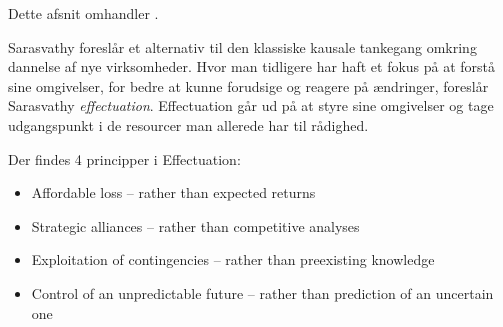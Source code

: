 
Dette afsnit omhandler \citet{sarasvathy2001effectuation}.

Sarasvathy foreslår et alternativ til den klassiske kausale tankegang omkring dannelse af nye virksomheder.
Hvor man tidligere har haft et fokus på at forstå sine omgivelser, for bedre at kunne forudsige og reagere på ændringer, foreslår Sarasvathy \textit{effectuation}.
Effectuation går ud på at styre sine omgivelser og tage udgangspunkt i de resourcer man allerede har til rådighed.

Der findes 4 principper i Effectuation:
\begin{itemize}
  \item Affordable loss -- rather than expected returns
  \item Strategic alliances -- rather than competitive analyses
  \item Exploitation of contingencies -- rather than preexisting knowledge
  \item Control of an unpredictable future -- rather than prediction of an uncertain one
\end{itemize}

